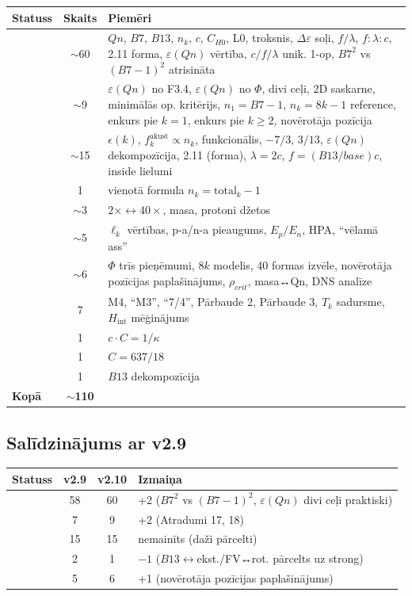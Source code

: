 \documentclass[12pt,a4paper]{article}
\begin{document}
\begin{table}[h]
\centering
\begin{tabular}{|l|c|l|}
\hline
\textbf{Statuss} & \textbf{Skaits} & \textbf{Piemēri} \\
\hline
[CIETS] & $\sim$60 & $Qn$, $B7$, $B13$, $n_k$, $c$, $C_{H0}$, L0, troksnis, $\Delta\varepsilon$ soļi, $f/\lambda$, $f:\lambda:c$, 2.11 forma, $\varepsilon(Qn)$ vērtība, $c/f/\lambda$ unik. 1-op, $B7^2$ vs $(B7-1)^2$ atrisināta \\
[SADERĪBA-strong] & $\sim$9 & $\varepsilon(Qn)$ no F3.4, $\varepsilon(Qn)$ no $\Phi$, divi ceļi, 2D saskarne, minimālās op. kritērijs, $n_1=B7-1$, $n_k=8k-1$ reference, enkurs pie $k=1$, enkurs pie $k\geq 2$, novērotāja pozīcija \\
[SADERĪBA] & $\sim$15 & $\epsilon(k)$, $f_k^{\text{akust}}\propto n_k$, funkcionālis, $-7/3$, $3/13$, $\varepsilon(Qn)$ dekompozīcija, 2.11 (forma), $\lambda=2c$, $f=(B13/base)c$, inside lielumi \\
[SADERĪBA-kand.] & 1 & vienotā formula $n_k=\text{total}_k-1$ \\
[HIPOTĒZE] & $\sim$3 & $2\times\leftrightarrow 40\times$, masa, protoni džetos \\
[EMPĪRISKS] & $\sim$5 & $\ell_k$ vērtības, p-a/n-a pieaugums, $E_p/E_n$, HPA, ``vēlamā ass'' \\
[ATVĒRTS] & $\sim$6 & $\Phi$ trīs pieņēmumi, $8k$ modelis, 40 formas izvēle, novērotāja pozīcijas paplašinājums, $\rho_{crit}$, masa↔Qn, DNS analīze \\
[KĻŪDA] & 7 & M4, ``M3'', ``7/4'', Pārbaude 2, Pārbaude 3, $T_k$ sadursme, $H_{\text{int}}$ mēģinājums \\
[NEJAUŠA] & 1 & $c\cdot C=1/\kappa$ \\
[ARTEFAKTS] & 1 & $C=637/18$ \\
[NEJĒGPILNS] & 1 & $B13$ dekompozīcija \\
\hline
\textbf{Kopā} & $\sim$\textbf{110} & \\
\hline
\end{tabular}
\end{table}

\subsection*{Salīdzinājums ar v2.9}

\begin{table}[h]
\centering
\begin{tabular}{|l|c|c|l|}
\hline
\textbf{Statuss} & \textbf{v2.9} & \textbf{v2.10} & \textbf{Izmaiņa} \\
\hline
[CIETS] & 58 & 60 & +2 ($B7^2$ vs $(B7-1)^2$, $\varepsilon(Qn)$ divi ceļi praktiski) \\
[SADERĪBA-strong] & 7 & 9 & +2 (Atradumi 17, 18) \\
[SADERĪBA] & 15 & 15 & nemainīts (daži pārcelti) \\
[SADERĪBA-kand.] & 2 & 1 & $-1$ ($B13↔$ekst./FV↔rot. pārcelts uz strong) \\
[ATVĒRTS] & 5 & 6 & +1 (novērotāja pozīcijas paplašinājums) \\
\hline
\end{tabular}
\end{table}
\end{document}
